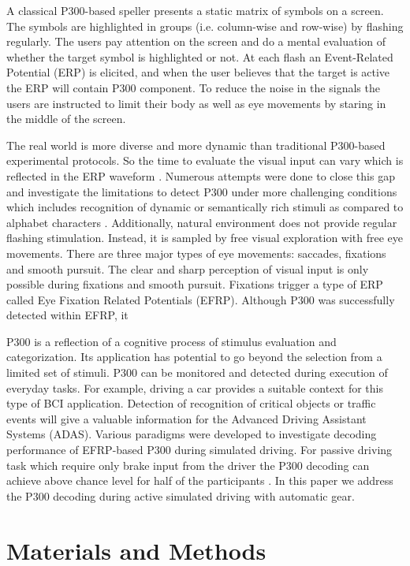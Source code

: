 \documentclass[12pt]{iopart}
\begin{document}
A classical P300-based speller presents a static matrix of symbols on a screen.
The symbols are highlighted in groups (i.e. column-wise and row-wise)
by flashing regularly. The users pay attention on the screen and 
do a mental evaluation of whether the target symbol is highlighted or not.
At each flash an Event-Related Potential (ERP)
is elicited, and when the user believes that the target is active
the ERP will contain P300 component.
To reduce the noise in the signals the users are instructed to limit their body as well as
eye movements by staring in the middle of the screen.

The real world is more diverse and more dynamic than traditional
P300-based experimental protocols. So the time to evaluate
the visual input can vary which is reflected in the ERP waveform \cite{arico_evaluation_2013}.
Numerous attempts were done to close this gap and investigate
the limitations to detect P300 under more challenging conditions
which includes recognition of dynamic or semantically
rich stimuli as compared to alphabet characters \cite{rosenthal_evoked_2014}.
Additionally, natural environment does not provide regular flashing stimulation.
Instead, it is sampled by free visual exploration with free eye movements.
There are three major types of eye movements: saccades, fixations
and smooth pursuit. The clear and sharp perception of visual input
is only possible during fixations and smooth pursuit.
Fixations trigger a type of ERP called Eye Fixation Related Potentials (EFRP).
Although P300 was successfully detected within EFRP,
it 


P300 is a reflection of a cognitive process of stimulus evaluation and
categorization. Its application has potential to go beyond the selection from 
a limited set of stimuli. P300 can be monitored and detected during execution
of everyday tasks. For example, driving a car provides a suitable context
for this type of BCI application. Detection of recognition of critical objects
or traffic events will give a valuable information for the Advanced
Driving Assistant Systems (ADAS). Various paradigms were developed
to investigate decoding performance of EFRP-based P300 during simulated driving.
For passive driving task which require only brake input from the driver
the P300 decoding can achieve above chance level for half of the participants \cite{jangraw_neurally_2014}.
In this paper we address the P300 decoding during active simulated driving with automatic gear.




\section{Materials and Methods}
\label{sec:methods}
\end{document}
